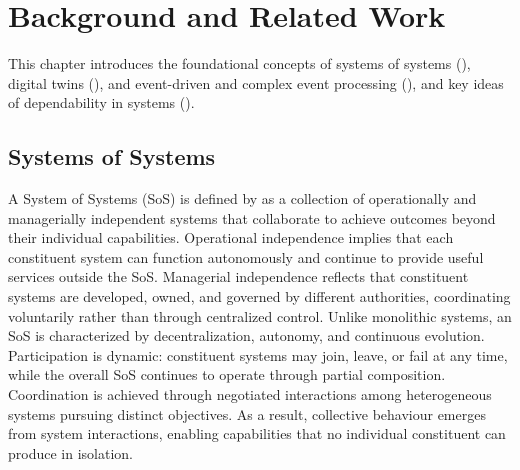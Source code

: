 \chapter{Background and Related Work}\label{ch:background}
This chapter introduces the foundational concepts of systems of systems (), digital twins (), and event-driven and complex event processing (), and key ideas of dependability in systems ().

\section{Systems of Systems}\label{sec:background-sos}
A System of Systems (SoS) is defined by \citet{maier1998architecting} as a collection of operationally and managerially independent systems that collaborate to achieve outcomes beyond their individual capabilities. Operational independence implies that each constituent system can function autonomously and continue to provide useful services outside the SoS. Managerial independence reflects that constituent systems are developed, owned, and governed by different authorities, coordinating voluntarily rather than through centralized control. Unlike monolithic systems, an SoS is characterized by decentralization, autonomy, and continuous evolution. Participation is dynamic: constituent systems may join, leave, or fail at any time, while the overall SoS continues to operate through partial composition. Coordination is achieved through negotiated interactions among heterogeneous systems pursuing distinct objectives. As a result, collective behaviour emerges from system interactions, enabling capabilities that no individual constituent can produce in isolation.

